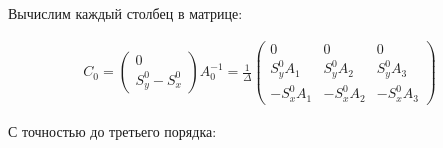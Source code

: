 Вычислим каждый столбец в матрице:

\begin{equation}
\begin{aligned}
	C_0 = \begin{pmatrix}0 \\ S_y^0 -S_x^0\end{pmatrix}A_0^{-1} = \frac{1}{\Delta}\begin{pmatrix}
	0 & 0 & 0 \\ S_y^0A_1 & S_y^0A_2 & S_y^0A_3 \\ -S_x^0A_1 & -S_x^0A_2 & -S_x^0A_3
	\end{pmatrix}
\end{aligned}
\end{equation}

С точностью до третьего порядка:

